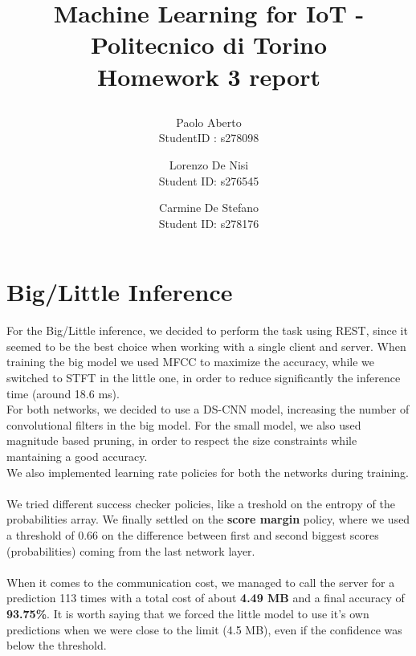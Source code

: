 \documentclass{article}
\date{}
\begin{document}
\author{Paolo Aberto\\
StudentID : s278098\\

\and
Lorenzo De Nisi\\
Student ID: s276545\\

\and
Carmine De Stefano\\
Student ID: s278176\\
}

\justifying

\title{
    \vspace{0.4cm}
    
    Machine Learning for IoT - 
    Politecnico di Torino\\
    \vspace{.5cm}
    \Large \textbf{Homework 3 report}
    \vspace{0cm}
}

\maketitle
\thispagestyle{empty} 
\vspace{-1cm}


\section{Big/Little Inference}
For the Big/Little inference, we decided to perform the task using REST, since it seemed to be the best choice when working with a single client and server.
When training the big model we used MFCC to maximize the accuracy, while we switched to STFT in the little one, in order to reduce significantly the inference time (around 18.6 ms).
\\
For both networks, we decided to use a DS-CNN model, increasing the number of convolutional filters in the big model. For the small model, we also used magnitude based pruning, in order to respect the size constraints while mantaining a good accuracy.\\
We also implemented learning rate policies for both the networks during training.\\\\
We tried different success checker policies, like a treshold on the entropy of the probabilities array. We finally settled on the \textbf{score margin} policy, where we used a threshold of 0.66 on the difference between first and second biggest scores (probabilities) coming from the last network layer.
\\\\
When it comes to the communication cost, we managed to call the server for a prediction 113 times with a total cost of about \textbf{4.49 MB} and a final accuracy of \textbf{93.75\%}.
It is worth saying that we forced the little model to use it's own predictions when we were close to the limit (4.5 MB), even if the confidence was below the threshold. 
\end{document}
